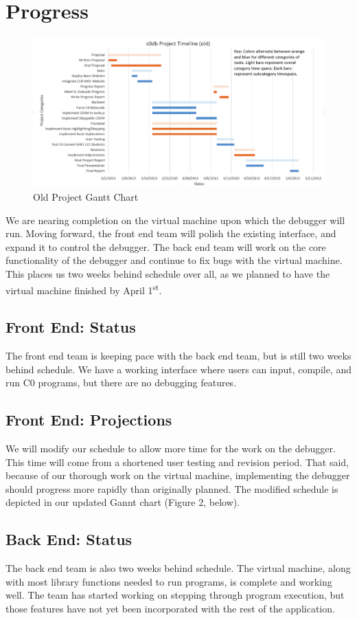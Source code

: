 \documentclass[11pt]{article}
\begin{document}
\section{Progress}
\begin{figure}[h]
  \centering
  \includegraphics[width=\linewidth]{old-gantt.png}
  \caption{Old Project Gantt Chart}
  \label{fig:old-gantt}
\end{figure}
We are nearing completion on the virtual machine upon which the debugger will
run. Moving forward, the front end team will polish the existing interface, and
expand it to control the debugger. The back end team will work on the core
functionality of the debugger and continue to fix bugs with the virtual machine.
This places us two weeks behind schedule over all, as we planned to have the
virtual machine finished by April 1\textsuperscript{st}.
\subsection{Front End: Status}
The front end team is keeping pace with the back end team, but is still two
weeks behind schedule. We have a working interface where users can input,
compile, and run C0 programs, but there are no debugging features.
\subsection{Front End: Projections}
We will modify our schedule to allow more time for the work on the debugger.
This time will come from a shortened user testing and revision period. That
said, because of our thorough work on the virtual machine, implementing the
debugger should progress more rapidly than originally planned. The modified
schedule is depicted in our updated Gannt chart (Figure 2, below).
\subsection{Back End: Status}
The back end team is also two weeks behind schedule. The virtual machine, along
with most library functions needed to run programs, is complete and working
well. The team has started working on stepping through program execution, but
those features have not yet been incorporated with the rest of the application.
\end{document}
